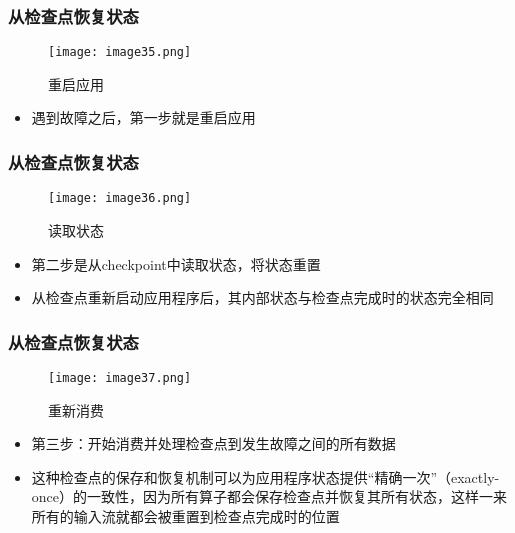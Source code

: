 \documentclass{beamer}
\begin{document}
  \begin{frame}
      \frametitle{从检查点恢复状态}

      \begin{figure}
        \centering
        \texttt{[image: image35.png]}
        \caption{重启应用}
      \end{figure}
  
      \begin{itemize}
          \item 遇到故障之后，第一步就是重启应用
      \end{itemize}
  
  \end{frame}

  \begin{frame}
      \frametitle{从检查点恢复状态}

      \begin{figure}
        \centering
        \texttt{[image: image36.png]}
        \caption{读取状态}
      \end{figure}
  
      \begin{itemize}
          \item 第二步是从checkpoint中读取状态，将状态重置
          \item 从检查点重新启动应用程序后，其内部状态与检查点完成时的状态完全相同
      \end{itemize}
  
  \end{frame}

  \begin{frame}
      \frametitle{从检查点恢复状态}

      \begin{figure}
        \centering
        \texttt{[image: image37.png]}
        \caption{重新消费}
      \end{figure}
  
      \begin{itemize}
          \item 第三步：开始消费并处理检查点到发生故障之间的所有数据
          \item 这种检查点的保存和恢复机制可以为应用程序状态提供“精确一次”（exactly-once）的一致性，因为所有算子都会保存检查点并恢复其所有状态，这样一来所有的输入流就都会被重置到检查点完成时的位置
      \end{itemize}
  
  \end{frame}
\end{document}
